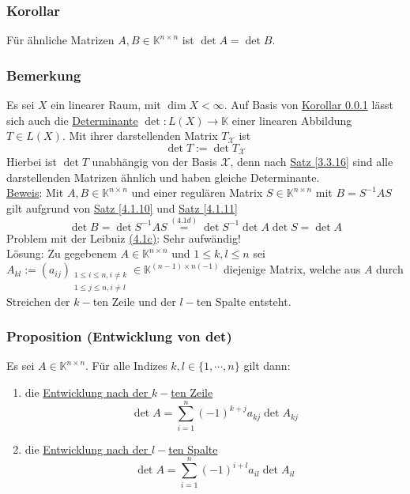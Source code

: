 \subsubsection{Korollar}
\label{4.1.12}
Für ähnliche Matrizen $A,B\in\mathbb{K}^{n\times n}$ ist $\det A=\det B$.
\subsubsection{Bemerkung}
Es sei $X$ ein linearer Raum, mit $\dim X<\infty$.  Auf Basis von \hyperref[4.1.12]{Korollar \ref{4.1.12}} lässt sich auch die \underline{Determinante} $\det\colon L(X)\rightarrow \mathbb{K}$ einer linearen Abbildung $T\in L(X)$.  Mit ihrer darstellenden Matrix $T_\mathcal{X}$ ist
\[\det T:=\det T_\mathcal{X}\]
Hierbei ist $\det T$ unabhängig von der Basis $\mathcal{X}$, denn nach \hyperref[3.3.16]{Satz \ref{3.3.16}} sind alle darstellenden Matrizen ähnlich und haben gleiche Determinante.\\
\underline{Beweis}:  Mit $A,B\in\mathbb{K}^{n\times n}$ und einer regulären Matrix $S\in\mathbb{K}^{n\times n}$ mit $B=S^{-1}AS$ gilt aufgrund von \hyperref[4.1.10]{Satz \ref{4.1.10}} und \hyperref[4.1.11]{Satz \ref{4.1.11}}
\[\det B=\det S^{-1}AS\stackrel{\hyperref[4.1d]{(4.1d)}}{=}\det S^{-1}\det A\det S=\det A\]
Problem mit der Leibniz \hyperref[4.1c]{(4.1c)}: Sehr aufwändig!\\
Lösung: Zu gegebenem $A\in\mathbb{K}^{n\times n}$ und $1\leq k,l\leq n$ sei $A_{kl}:=(a_{ij})_{\substack{1\leq i\leq n, i\not=k\\ 1\leq j\leq n, i\not=l}}\in\mathbb{K}^{(n-1)\times n(-1)}$ diejenige Matrix, welche aus $A$ durch Streichen der $k-$ten Zeile und der $l-$ten Spalte entsteht.
\subsubsection{Proposition (Entwicklung von det)}
\label{4.1.14}
Es sei $A\in\mathbb{K}^{n\times n}$.  Für alle Indizes $k,l\in\{1,\cdots ,n\}$ gilt dann:
\renewcommand{\labelenumi}{(\alph{enumi})}
\begin{enumerate}
\item die \underline{Entwicklung nach der $k-$ten Zeile}
\[\det A=\sum _{i=1}^n (-1)^{k+j}a_{kj}\det A_{kj}\]
\item die \underline{Entwicklung nach der $l-$ten Spalte}
\[\det A=\sum _{i=1}^n (-1)^{i+l}a_{il}\det A_{il}\]
\end{enumerate}

